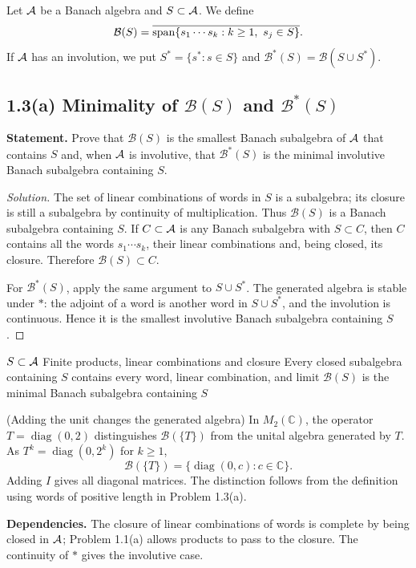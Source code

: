 Let $\mathcal A$ be a Banach algebra and $S\subset\mathcal A$. We define
\[
\mathcal B(S)=\overline{\operatorname{span}\{s_1\cdots s_k:k\ge1,\ s_j\in S\}}.
\]
If $\mathcal A$ has an involution, we put $S^*=\{s^*:s\in S\}$ and
$\mathcal B^*(S)=\mathcal B(S\cup S^*)$.

\subsection*{1.3(a) Minimality of $\mathcal B(S)$ and $\mathcal B^*(S)$}

\noindent\textbf{Statement.} Prove that $\mathcal B(S)$ is the smallest Banach subalgebra of $\mathcal A$ that contains $S$ and, when $\mathcal A$ is involutive, that $\mathcal B^*(S)$ is the minimal involutive Banach subalgebra containing $S$.

\begin{proof}[Solution]
The set of linear combinations of words in $S$ is a subalgebra; its closure is still a subalgebra by continuity of multiplication. Thus $\mathcal B(S)$ is a
Banach subalgebra containing $S$. If $C\subset\mathcal A$ is any Banach subalgebra with $S\subset C$,
then $C$ contains all the words $s_1\cdots s_k$, their linear combinations and, being
closed, its closure. Therefore $\mathcal B(S)\subset C$.

For $\mathcal B^*(S)$, apply the same argument to $S\cup S^*$. The generated algebra is stable under
$*$: the adjoint of a word is another word in $S\cup S^*$, and the involution is continuous. Hence it is the smallest involutive Banach subalgebra containing $S$.
\end{proof}

\pagebreak
\proofdiagram
{$S\subset\mathcal A$}
{Finite products, linear combinations and closure}
{Every closed subalgebra containing $S$ contains every word, linear combination, and limit}
{$\mathcal B(S)$ is the minimal Banach subalgebra containing $S$}

\begin{cthejemplo}{(Adding the unit changes the generated algebra)}
In $M_2(\mathbb C)$, the operator $T=\operatorname{diag}(0,2)$ distinguishes
$\mathcal B(\{T\})$ from the unital algebra generated by $T$.
As $T^k=\operatorname{diag}(0,2^k)$ for $k\ge1$,
\[
 \mathcal B(\{T\})=\{\operatorname{diag}(0,c):c\in\mathbb C\}.
\]
Adding $I$ gives all diagonal matrices. The distinction follows from the definition using words of positive length in Problem 1.3(a).
\end{cthejemplo}

\noindent\textbf{Dependencies.} The closure of linear combinations of words is complete by being closed in $\mathcal A$; Problem 1.1(a) allows products to pass to the closure. The continuity of $*$ gives the involutive case.

